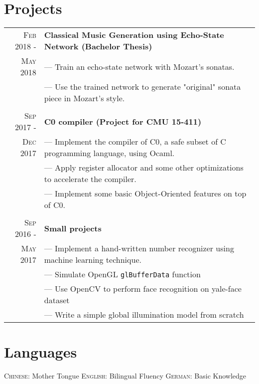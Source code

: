 \documentclass[a4paper,10pt]{article}
\begin{document}
	\section{Projects}
	\begin{tabular}{r | l}
		\textsc{Feb 2018 - } & \textbf{Classical Music Generation using Echo-State Network (Bachelor Thesis)} \\\textsc{May 2018}& --- Train an echo-state network with Mozart's sonatas.
		\\& --- Use the trained network to generate "original" sonata piece in Mozart's style.
		\\ \multicolumn{1}{c}{} \\
		
		\textsc{Sep 2017 - } & \textbf{C0 compiler (Project for CMU 15-411)} \\\textsc{Dec 2017}& --- Implement the compiler of C0, a safe subset of C programming language, using Ocaml.
		\\& --- Apply register allocator and some other optimizations to accelerate the compiler.
		\\& --- Implement some basic Object-Oriented features on top of C0.
		\\ \multicolumn{1}{c}{} \\
		
		\textsc{Sep 2016 - } & \textbf{Small projects} 
		\\\textsc{May 2017}& --- Implement a hand-written number recognizer using machine learning technique.
		\\& --- Simulate OpenGL \texttt{glBufferData} function
		\\& --- Use OpenCV to perform face recognition on yale-face dataset
		\\& --- Write a simple global illumination model from scratch
	\end{tabular}
	
	\section{Languages}
	\textsc{Chinese:} Mother Tongue \quad \quad
	\textsc{English:} Bilingual Fluency \quad \quad
	\textsc{German:} Basic Knowledge \quad \quad
	
\end{document}

